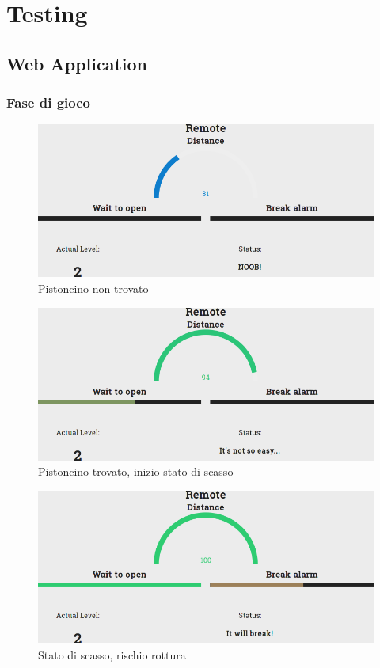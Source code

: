 \chapter{Testing}
\section{Web Application}
\subsection{Fase di gioco}
\begin{figure}[!ht]
	\centering
	\includegraphics[scale=.25]{img/testing/game1.png}
	\caption{Pistoncino non trovato}
\end{figure}

\begin{figure}[!ht]
	\centering
	\includegraphics[scale=.25]{img/testing/game2.png}
	\caption{Pistoncino trovato, inizio stato di scasso}
\end{figure}

\begin{figure}[!ht]
	\centering
	\includegraphics[scale=.25]{img/testing/game3.png}
	\caption{Stato di scasso, rischio rottura}
\end{figure}

